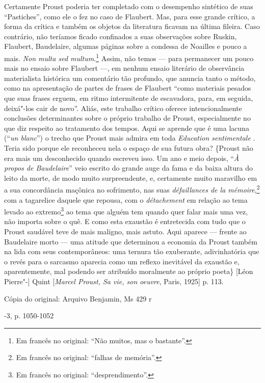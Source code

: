 Certamente Proust poderia ter completado com o desempenho sintético de
suas ``Pastiches'', como ele o fez no caso de Flaubert. Mas, para esse
grande crítico, a forma da crítica e também os objetos da literatura
ficavam na última fileira. Caso contrário, não teríamos ficado
confinados a suas observações sobre Ruskin, Flaubert, Baudelaire,
algumas páginas sobre a condessa de Noailles e pouco a mais. \emph{Non
multa sed multum}.\footnote{Em francês no original: ``Não muitos,
  mas o bastante''. \versal{[N. T.]}} Assim, não temos --- para permanecer um pouco mais
no ensaio sobre Flaubert ---, em nenhum ensaio literário de observância
materialista histórica um comentário tão profundo, que anuncia tanto o
método, como na apresentação de partes de frases de Flaubert ``como
materiais pesados que suas frases erguem, em ritmo intermitente de
escavadora, para, em seguida, deixá"-los cair de novo''. Aliás, este
trabalho crítico oferece intencionalmente conclusões determinantes sobre
o próprio trabalho de Proust, especialmente no que diz respeito ao
tratamento dos tempos. Aqui se aprende que é uma lacuna (``\emph{un
blanc}'') o trecho que Proust mais admira em toda \emph{Education
sentimentale} . Teria sido porque ele reconheceu nela o espaço de sua
futura obra? \{Proust não era mais um desconhecido quando escreveu isso.
Um ano e meio depois, ``\emph{À propos de Baudelaire}'' veio escrito do
grande auge da fama e da baixa altura do leito da morte, de modo muito
surpreendente, e, certamente muito maravilho em a sua concordância
maçônica no sofrimento, nas suas \emph{défaillances de la
mémoire},\footnote{Em francês no original: ``falhas de memória''. \versal{[N. T.]}}
com a tagarelice daquele que repousa, com o \emph{détachement} em
relação ao tema levado ao extremo\footnote{Em francês no original:
  ``desprendimento''. \versal{[N. T.]}} ao tema que alguém tem quando quer falar mais uma
vez, não importa sobre o quê. E como esta exaustão é entretecida com
tudo que o Proust saudável teve de mais maligno, mais astuto. Aqui
aparece --- frente ao Baudelaire morto --- uma atitude que determinou a
economia da Proust também na lida com seus contemporâneos: uma ternura
tão exuberante, adivinhatória que o revés para o sarcasmo aparecia como
um reflexo inevitável da exaustão e, aparentemente, mal podendo ser
atribuído moralmente ao próprio poeta\} {[}Léon Pierre"-{]} Quint
{[}\emph{Marcel Proust, Sa vie, son oeuvre}, Paris, 1925{]} p. 113.

Cópia do original: Arquivo Benjamin, Ms 429 r

-3, p. 1050-1052

